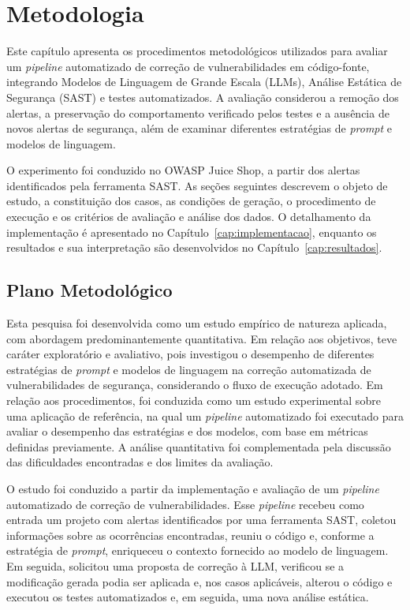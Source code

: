 \chapter[Metodologia]{Metodologia}
\label{cap:metodologia}

Este capítulo apresenta os procedimentos metodológicos utilizados para avaliar um \textit{pipeline} automatizado de correção de vulnerabilidades em código-fonte, integrando Modelos de Linguagem de Grande Escala (LLMs), Análise Estática de Segurança (SAST) e testes automatizados. A avaliação considerou a remoção dos alertas, a preservação do comportamento verificado pelos testes e a ausência de novos alertas de segurança, além de examinar diferentes estratégias de \textit{prompt} e modelos de linguagem.

O experimento foi conduzido no OWASP Juice Shop, a partir dos alertas identificados pela ferramenta SAST. As seções seguintes descrevem o objeto de estudo, a constituição dos casos, as condições de geração, o procedimento de execução e os critérios de avaliação e análise dos dados. O detalhamento da implementação é apresentado no Capítulo~\ref{cap:implementacao}, enquanto os resultados e sua interpretação são desenvolvidos no Capítulo~\ref{cap:resultados}.

\section{Plano Metodológico}
\label{sec:met-plano}

Esta pesquisa foi desenvolvida como um estudo empírico de natureza aplicada, com abordagem predominantemente quantitativa. Em relação aos objetivos, teve caráter exploratório e avaliativo, pois investigou o desempenho de diferentes estratégias de \textit{prompt} e modelos de linguagem na correção automatizada de vulnerabilidades de segurança, considerando o fluxo de execução adotado. Em relação aos procedimentos, foi conduzida como um estudo experimental sobre uma aplicação de referência, na qual um \textit{pipeline} automatizado foi executado para avaliar o desempenho das estratégias e dos modelos, com base em métricas definidas previamente. A análise quantitativa foi complementada pela discussão das dificuldades encontradas e dos limites da avaliação.

O estudo foi conduzido a partir da implementação e avaliação de um \textit{pipeline} automatizado de correção de vulnerabilidades. Esse \textit{pipeline} recebeu como entrada um projeto com alertas identificados por uma ferramenta SAST, coletou informações sobre as ocorrências encontradas, reuniu o código e, conforme a estratégia de \textit{prompt}, enriqueceu o contexto fornecido ao modelo de linguagem. Em seguida, solicitou uma proposta de correção à LLM, verificou se a modificação gerada podia ser aplicada e, nos casos aplicáveis, alterou o código e executou os testes automatizados e, em seguida, uma nova análise estática.

